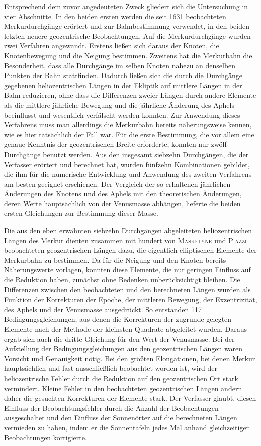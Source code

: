 Entsprechend dem zuvor angedeuteten Zweck gliedert sich die Untersuchung in vier Abschnitte. In den beiden ersten werden die seit 1631 beobachteten Merkurdurchgänge erörtert und zur Bahnbestimmung verwendet, in den beiden letzten neuere geozentrische Beobachtungen. Auf die Merkurdurchgänge wurden zwei Verfahren angewandt. Erstens ließen sich daraus der Knoten, die Knotenbewegung und die Neigung bestimmen. Zweitens hat die Merkurbahn die Besonderheit, dass alle Durchgänge im selben Knoten nahezu an denselben Punkten der Bahn stattfinden. Dadurch ließen sich die durch die Durchgänge gegebenen heliozentrischen Längen in der Ekliptik auf mittlere Längen in der Bahn reduzieren, ohne dass die Differenzen zweier Längen durch andere Elemente als die mittlere jährliche Bewegung und die jährliche Änderung des Aphels beeinflusst und wesentlich verfälscht werden konnten. Zur Anwendung dieses Verfahrens muss man allerdings die Merkurbahn bereits näherungsweise kennen, wie es hier tatsächlich der Fall war. Für die erste Bestimmung, die vor allem eine genaue Kenntnis der geozentrischen Breite erforderte, konnten nur zwölf Durchgänge benutzt werden. Aus den insgesamt siebzehn Durchgängen, die der Verfasser erörtert und berechnet hat, wurden fünfzehn Kombinationen gebildet, die ihm für die numerische Entwicklung und Anwendung des zweiten Verfahrens am besten geeignet erschienen. Der Vergleich der so erhaltenen jährlichen Änderungen des Knotens und des Aphels mit den theoretischen Änderungen, deren Werte hauptsächlich von der Venusmasse abhängen, lieferte die beiden ersten Gleichungen zur Bestimmung dieser Masse.

Die aus den eben erwähnten siebzehn Durchgängen abgeleiteten heliozentrischen Längen des Merkur dienten zusammen mit hundert von \textsc{Maskelyne} und \textsc{Piazzi} beobachteten geozentrischen Längen dazu, die eigentlich elliptischen Elemente der Merkurbahn zu bestimmen. Da für die Neigung und den Knoten bereits Näherungswerte vorlagen, konnten diese Elemente, die nur geringen Einfluss auf die Reduktion haben, zunächst ohne Bedenken unberücksichtigt bleiben. Die Differenzen zwischen den beobachteten und den berechneten Längen wurden als Funktion der Korrekturen der Epoche, der mittleren Bewegung, der Exzentrizität, des Aphels und der Venusmasse ausgedrückt. So entstanden 117 Bedingungsgleichungen, aus denen die Korrekturen der zugrunde gelegten Elemente nach der Methode der kleinsten Quadrate abgeleitet wurden. Daraus ergab sich auch die dritte Gleichung für den Wert der Venusmasse. Bei der Aufstellung der Bedingungsgleichungen aus den geozentrischen Längen waren Vorsicht und Genauigkeit nötig. Bei den größten Elongationen, bei denen Merkur hauptsächlich und fast ausschließlich beobachtet worden ist, wird der heliozentrische Fehler durch die Reduktion auf den geozentrischen Ort stark vermindert. Kleine Fehler in den beobachteten geozentrischen Längen ändern daher die gesuchten Korrekturen der Elemente stark. Der Verfasser glaubt, diesen Einfluss der Beobachtungsfehler durch die Anzahl der Beobachtungen ausgeschaltet und den Einfluss der Sonnenörter auf die berechneten Längen vermieden zu haben, indem er die Sonnentafeln jedes Mal anhand gleichzeitiger Beobachtungen korrigierte.

